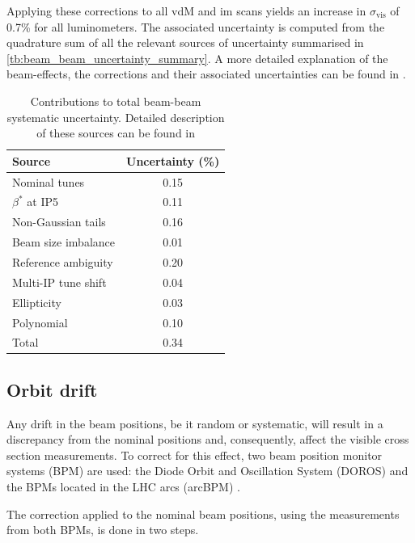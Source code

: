 Applying these corrections to all vdM and im scans yields an increase in $\sigma_{\mathrm{vis}}$ of 0.7\% for all luminometers. The associated uncertainty is computed from the quadrature sum of all the relevant sources of uncertainty summarised in \autoref{tb:beam_beam_uncertainty_summary}. A more detailed explanation of the beam-effects, the corrections and their associated uncertainties can be found in \cite{babaev2021coherentdeflectionellipticbunches}.

\begin{table}
	\centering
	\caption[Beam-beam systematic uncertainty]{Contributions to total beam-beam systematic uncertainty. Detailed description of these sources can be found in \cite{babaev2021coherentdeflectionellipticbunches}}\label{tab:bb:1}
	\label{tb:beam_beam_uncertainty_summary}
	\begin{tabular}{l|c}
		\hline
		Source & Uncertainty (\%) \\
		\hline
		Nominal tunes & 0.15 \\
		$\beta^{*}$ at IP5 & 0.11 \\
		Non-Gaussian tails & 0.16 \\
		Beam size imbalance & 0.01 \\
		Reference ambiguity & 0.20 \\
		Multi-IP tune shift & 0.04 \\
		Ellipticity & 0.03 \\
		Polynomial & 0.10 \\
		\hline
		Total & 0.34 \\
		\hline
	\end{tabular}
\end{table}

\subsection{Orbit drift}

Any drift in the beam positions, be it random or systematic, will result in a discrepancy from the nominal positions and, consequently, affect the visible cross section measurements. To correct for this effect, two beam position monitor systems (BPM) are used: the Diode Orbit and Oscillation System (DOROS) \cite{Gąsior:2313935} and the BPMs located in the LHC arcs (arcBPM) \cite{Sirunyan:2759951}.

The correction applied to the nominal beam positions, using the measurements from both BPMs, is done in two steps.

